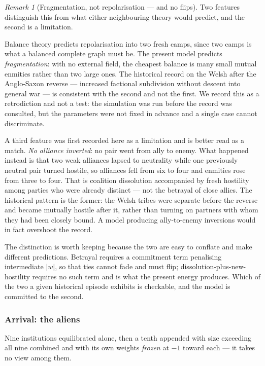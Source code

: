 \documentclass[11pt]{article}
\numberwithin{equation}{section}
\theoremstyle{plain}
\theoremstyle{definition}
\theoremstyle{remark}
\newtheorem{remark}[theorem]{Remark}
\begin{document}
\begin{remark}[Fragmentation, not repolarisation --- and no flips]
\label{ad:rem:welshreading}
Two features distinguish this from what either neighbouring theory would
predict, and the second is a limitation.

Balance theory predicts repolarisation into two fresh camps, since two
camps is what a balanced complete graph must be. The present model
predicts \emph{fragmentation}: with no external field, the cheapest
balance is many small mutual enmities rather than two large ones. The
historical record on the Welsh after the Anglo-Saxon reverse ---
increased factional subdivision without descent into general war --- is
consistent with the second and not the first. We record this as a
retrodiction and not a test: the simulation was run before the record
was consulted, but the parameters were not fixed in advance and a single
case cannot discriminate.

A third feature was first recorded here as a limitation and is better
read as a match. \emph{No alliance inverted}: no pair went from ally to
enemy. What happened instead is that two weak alliances lapsed to
neutrality while one previously neutral pair turned hostile, so
alliances fell from six to four and enmities rose from three to four.
That is coalition dissolution accompanied by fresh hostility among
parties who were already distinct --- not the betrayal of close allies.
The historical pattern is the former: the Welsh tribes were separate
before the reverse and became mutually hostile after it, rather than
turning on partners with whom they had been closely bound. A model
producing ally-to-enemy inversions would in fact overshoot the record.

The distinction is worth keeping because the two are easy to conflate
and make different predictions. Betrayal requires a commitment term
penalising intermediate $|w|$, so that ties cannot fade and must flip;
dissolution-plus-new-hostility requires no such term and is what the
present energy produces. Which of the two a given historical episode
exhibits is checkable, and the model is committed to the second.
\end{remark}

\subsubsection{Arrival: the aliens}\label{ad:subsub:aliens}

Nine institutions equilibrated alone, then a tenth appended with size
exceeding all nine combined and with its own weights \emph{frozen} at
$-1$ toward each --- it takes no view among them.
\end{document}
